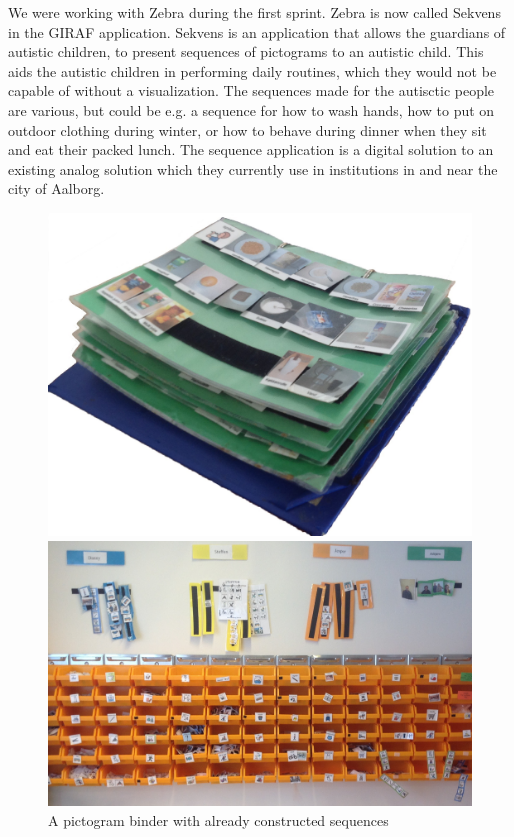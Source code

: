 We were working with Zebra during the first sprint. Zebra is now called Sekvens in the GIRAF application. Sekvens is an application that allows the guardians of autistic children, to present sequences of pictograms to an autistic child. This aids the autistic children in performing daily routines, which they would not be capable of without a visualization. The sequences made for the autisctic people are various, but could be e.g. a sequence for how to wash hands, how to put on outdoor clothing during winter, or how to behave during dinner when they sit and eat their packed lunch. The sequence application is a digital solution to an existing analog solution which they currently use in institutions in and near the city of Aalborg.

\begin{figure}
\centering
\begin{minipage}{.7\textwidth}
\centering
\includegraphics[scale=0.17]{Pics/Sprint1/pictogram_binder.jpg}
\caption{A pictogram binder with already constructed sequences}
\label{fig:pictogram_binder}
\includegraphics[scale=0.14]{Pics/Sprint1/pictogram_containers.jpg}

\end{minipage}
\end{figure}
